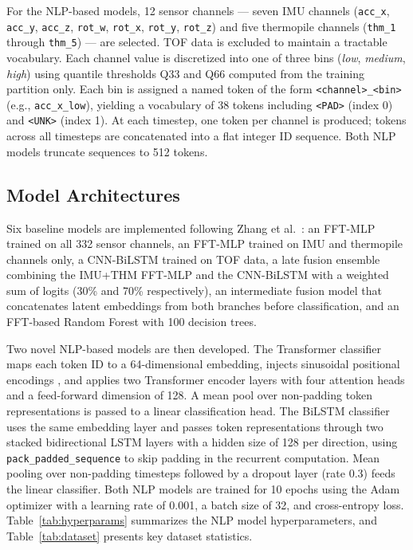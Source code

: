 \documentclass[conference]{IEEEtran}
\begin{document}
For the NLP-based models, 12 sensor channels — seven IMU channels (\texttt{acc\_x}, \texttt{acc\_y}, \texttt{acc\_z}, \texttt{rot\_w}, \texttt{rot\_x}, \texttt{rot\_y}, \texttt{rot\_z}) and five thermopile channels (\texttt{thm\_1} through \texttt{thm\_5}) — are selected. TOF data is excluded to maintain a tractable vocabulary. Each channel value is discretized into one of three bins (\textit{low}, \textit{medium}, \textit{high}) using quantile thresholds Q33 and Q66 computed from the training partition only. Each bin is assigned a named token of the form \texttt{<channel>\_<bin>} (e.g., \texttt{acc\_x\_low}), yielding a vocabulary of 38 tokens including \texttt{<PAD>} (index 0) and \texttt{<UNK>} (index 1). At each timestep, one token per channel is produced; tokens across all timesteps are concatenated into a flat integer ID sequence. Both NLP models truncate sequences to 512 tokens.

\subsection{Model Architectures}

Six baseline models are implemented following Zhang et al.\ \cite{zhang2025detection}: an FFT-MLP trained on all 332 sensor channels, an FFT-MLP trained on IMU and thermopile channels only, a CNN-BiLSTM trained on TOF data, a late fusion ensemble combining the IMU+THM FFT-MLP and the CNN-BiLSTM with a weighted sum of logits (30\% and 70\% respectively), an intermediate fusion model that concatenates latent embeddings from both branches before classification, and an FFT-based Random Forest with 100 decision trees.

Two novel NLP-based models are then developed. The Transformer classifier maps each token ID to a 64-dimensional embedding, injects sinusoidal positional encodings \cite{vaswani2017attention}, and applies two Transformer encoder layers with four attention heads and a feed-forward dimension of 128. A mean pool over non-padding token representations is passed to a linear classification head. The BiLSTM classifier uses the same embedding layer and passes token representations through two stacked bidirectional LSTM layers \cite{hochreiter1997lstm} with a hidden size of 128 per direction, using \texttt{pack\_padded\_sequence} to skip padding in the recurrent computation. Mean pooling over non-padding timesteps followed by a dropout layer (rate 0.3) feeds the linear classifier. Both NLP models are trained for 10 epochs using the Adam optimizer \cite{kingma2014adam} with a learning rate of 0.001, a batch size of 32, and cross-entropy loss. Table~\ref{tab:hyperparams} summarizes the NLP model hyperparameters, and Table~\ref{tab:dataset} presents key dataset statistics.
\end{document}
